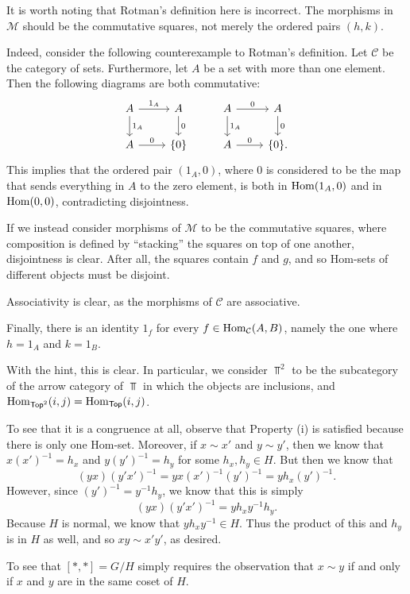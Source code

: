 \documentclass[../../solutions.tex]{subfiles}
\begin{document}
\begin{exercise} \leavevmode
It is worth noting that Rotman's definition here is incorrect. The morphisms in $\mathcal M$ should be the commutative squares, not merely the ordered pairs $(h,k)$. 

Indeed, consider the following counterexample to Rotman's definition. Let $\mathcal C$ be the category of sets. Furthermore, let $A$ be a set with more than one element. Then the following diagrams are both commutative: 
\[\begin{tikzcd}
A\arrow[r,"1_A"]\arrow[d,"1_A"]&A\arrow[d,"0"]&A\arrow[r,"0"]\arrow[d,"1_A"]&A\arrow[d,"0"]\\ 
A\arrow[r,"0"]&\{0\}&A\arrow[r,"0"]&\{0\}.
\end{tikzcd}\]
This implies that the ordered pair $(1_A,0)$, where $0$ is considered to be the map that sends everything in $A$ to the zero element, is both in $\operatorname{Hom}(1_A,0)$ and in $\operatorname{Hom}(0,0)$, contradicting disjointness. 

If we instead consider morphisms of $\mathcal M$ to be the commutative squares, where composition is defined by ``stacking'' the squares on top of one another, disjointness is clear. After all, the squares contain $f$ and $g$, and so Hom-sets of different objects must be disjoint. 

Associativity is clear, as the morphisms of $\mathcal C$ are associative.

Finally, there is an identity $1_f$ for every $f\in\operatorname{Hom}_{\mathcal C}(A,B)$, namely the one where $h=1_A$ and $k=1_B$. 
\end{exercise} 

\begin{exercise} \leavevmode
With the hint, this is clear. In particular, we consider $\Top^2$ to be the subcategory of the arrow category of $\Top$ in which the objects are inclusions, and $\operatorname{Hom}_{\mathsf{Top}^2}(i,j)=\operatorname{Hom}_{\mathsf{Top}}(i,j)$. 
\end{exercise} 

\begin{exercise} \leavevmode
To see that it is a congruence at all, observe that Property (i) is satisfied because there is only one Hom-set. Moreover, if $x\sim x'$ and $y\sim y'$, then we know that $x(x')^{-1}=h_x$ and $y(y')^{-1}=h_y$ for some $h_x,h_y\in H$. But then we know that \[(yx)(y'x')^{-1}=yx(x')^{-1}(y')^{-1}=yh_x(y')^{-1}.\] However, since $(y')^{-1}=y^{-1}h_y$, we know that this is simply \[(yx)(y'x')^{-1}=yh_xy^{-1}h_y.\] Because $H$ is normal, we know that $yh_xy^{-1}\in H$. Thus the product of this and $h_y$ is in $H$ as well, and so $xy\sim x'y'$, as desired. 

To see that $[*,*]=G/H$ simply requires the observation that $x\sim y$ if and only if $x$ and $y$ are in the same coset of $H$. 
\end{exercise} 
\end{document}
